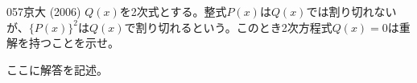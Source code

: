 \begin{prob}{057}{}{京大 (2006)}
 $Q(x)$を2次式とする。整式$P(x)$は$Q(x)$では割り切れないが、$\{P(x)\}^2$は$Q(x)$で割り切れるという。このとき2次方程式$Q(x)=0$は重解を持つことを示せ。
\end{prob}
ここに解答を記述。